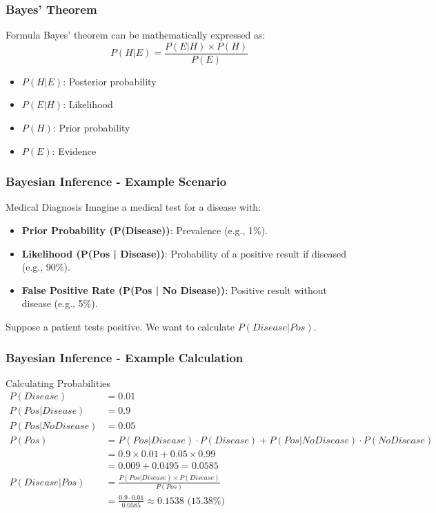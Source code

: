 \documentclass[aspectratio=169]{beamer}
\begin{document}
\begin{frame}[fragile]
    \frametitle{Bayes' Theorem}
    \begin{block}{Formula}
        Bayes' theorem can be mathematically expressed as:
        \begin{equation}
        P(H | E) = \frac{P(E | H) \times P(H)}{P(E)}
        \end{equation}
    \end{block}
    \begin{itemize}
        \item \( P(H | E) \): Posterior probability
        \item \( P(E | H) \): Likelihood
        \item \( P(H) \): Prior probability
        \item \( P(E) \): Evidence
    \end{itemize}
\end{frame}

\begin{frame}[fragile]
    \frametitle{Bayesian Inference - Example Scenario}
    \begin{block}{Medical Diagnosis}
        Imagine a medical test for a disease with:
        \begin{itemize}
            \item \textbf{Prior Probability (P(Disease))}: Prevalence (e.g., 1\%).
            \item \textbf{Likelihood (P(Pos | Disease))}: Probability of a positive result if diseased (e.g., 90\%).
            \item \textbf{False Positive Rate (P(Pos | No Disease))}: Positive result without disease (e.g., 5\%).
        \end{itemize}
    \end{block}
    Suppose a patient tests positive. We want to calculate \( P(Disease | Pos) \).
\end{frame}

\begin{frame}[fragile]
    \frametitle{Bayesian Inference - Example Calculation}
    \begin{block}{Calculating Probabilities}
        \begin{align*}
            P(Disease) & = 0.01 \\
            P(Pos | Disease) & = 0.9 \\
            P(Pos | No Disease) & = 0.05 \\
            P(Pos) & = P(Pos | Disease) \cdot P(Disease) + P(Pos | No Disease) \cdot P(No Disease) \\
            & = 0.9 \times 0.01 + 0.05 \times 0.99 \\
            & = 0.009 + 0.0495 = 0.0585 \\
            P(Disease | Pos) & = \frac{P(Pos | Disease) \times P(Disease)}{P(Pos)} \\
            & = \frac{0.9 \cdot 0.01}{0.0585} \approx 0.1538 \text{ (15.38\%)}
        \end{align*}
    \end{block}
\end{frame}
\end{document}
